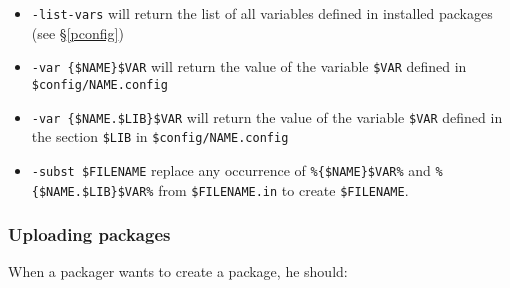 \documentclass[a4paper,11pt]{article}
\begin{document}
\begin{itemize}

\item \verb+-list-vars+ will return the list of all variables defined
  in installed packages (see \S\ref{pconfig})
\item \verb+-var {$NAME}$VAR+ will return the value of the variable
  \verb+$VAR+ defined in \verb+$config/NAME.config+
\item \verb+-var {$NAME.$LIB}$VAR+ will return the value of the
  variable \verb+$VAR+ defined in the section \verb+$LIB+ in
  \verb+$config/NAME.config+
\item \verb+-subst $FILENAME+ replace any occurrence of
  \verb+%{$NAME}$VAR%+ and \verb+%{$NAME.$LIB}$VAR%+ from
  \verb+$FILENAME.in+ to create \verb+$FILENAME+.

\end{itemize}


\subsubsection{Uploading packages}
\label{upload}

When a packager wants to create a package, he should:
\end{document}
